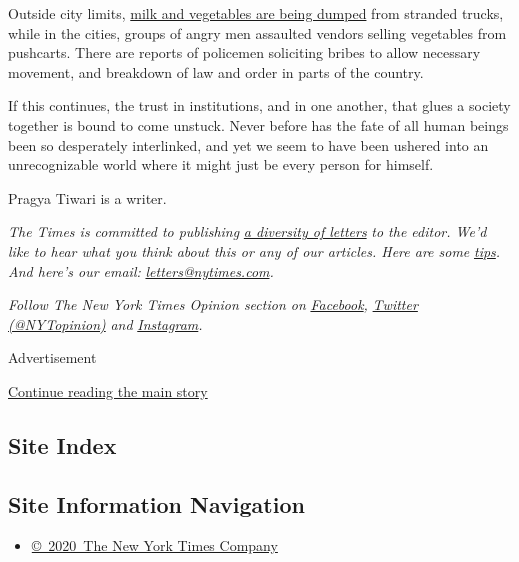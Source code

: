 Outside city limits,
\href{https://www.ndtv.com/india-news/coronavirus-india-lockdown-e-tailers-complain-police-beating-up-delivery-agents-2200587}{milk
and vegetables are being dumped} from stranded trucks, while in the
cities, groups of angry men assaulted vendors selling vegetables from
pushcarts. There are reports of policemen soliciting bribes to allow
necessary movement, and breakdown of law and order in parts of the
country.

If this continues, the trust in institutions, and in one another, that
glues a society together is bound to come unstuck. Never before has the
fate of all human beings been so desperately interlinked, and yet we
seem to have been ushered into an unrecognizable world where it might
just be every person for himself.

Pragya Tiwari is a writer.

\emph{The Times is committed to publishing}
\href{https://www.nytimes.com/2019/01/31/opinion/letters/letters-to-editor-new-york-times-women.html}{\emph{a
diversity of letters}} \emph{to the editor. We'd like to hear what you
think about this or any of our articles. Here are some}
\href{https://help.nytimes.com/hc/en-us/articles/115014925288-How-to-submit-a-letter-to-the-editor}{\emph{tips}}\emph{.
And here's our email:}
\href{mailto:letters@nytimes.com}{\emph{letters@nytimes.com}}\emph{.}

\emph{Follow The New York Times Opinion section on}
\href{https://www.facebook.com/nytopinion}{\emph{Facebook}}\emph{,}
\href{http://twitter.com/NYTOpinion}{\emph{Twitter (@NYTopinion)}}
\emph{and}
\href{https://www.instagram.com/nytopinion/}{\emph{Instagram}}\emph{.}

Advertisement

\protect\hyperlink{after-bottom}{Continue reading the main story}

\hypertarget{site-index}{%
\subsection{Site Index}\label{site-index}}

\hypertarget{site-information-navigation}{%
\subsection{Site Information
Navigation}\label{site-information-navigation}}

\begin{itemize}
\tightlist
\item
  \href{https://help.nytimes.com/hc/en-us/articles/115014792127-Copyright-notice}{©~2020~The
  New York Times Company}
\end{itemize}

